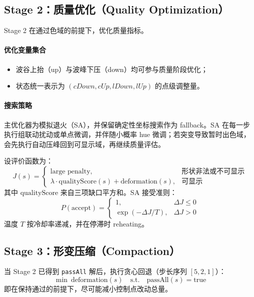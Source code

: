 \documentclass[UTF8,fontset=fandol]{ctexart}
\begin{document}
\subsection{Stage 2：质量优化（Quality Optimization）}
Stage 2 在通过色域的前提下，优化质量指标。

\paragraph{优化变量集合}
\begin{itemize}
    \item 波谷上抬（up）与波峰下压（down）均可参与质量阶段优化；
    \item 状态统一表示为 \((cDown,cUp,lDown,lUp)\) 的点级调整量。
\end{itemize}

\paragraph{搜索策略}
主优化器为模拟退火（SA），并保留确定性坐标搜索作为 fallback。SA 在每一步执行组联动扰动或单点微调，并伴随小概率 hue 微调；若突变导致暂时出色域，会先执行自动压峰回到可显示域，再继续质量评估。

设评价函数为：
\[
J(s)=
\begin{cases}
\text{large penalty}, & \text{形状非法或不可显示} \\
\lambda \cdot \text{qualityScore}(s)+\text{deformation}(s), & \text{可显示}
\end{cases}
\]
其中 \(\text{qualityScore}\) 来自三项缺口平方和。SA 接受准则：
\begin{equation}
P(\text{accept})=
\begin{cases}
1, & \Delta J \le 0\\
\exp(-\Delta J/T), & \Delta J > 0
\end{cases}
\end{equation}
温度 \(T\) 按冷却率递减，并在停滞时 reheating。

\subsection{Stage 3：形变压缩（Compaction）}
当 Stage 2 已得到 \texttt{passAll} 解后，执行贪心回退（步长序列 \([5,2,1]\)）：
\begin{equation}
\min \ \text{deformation}(s)\quad \text{s.t.}\quad \text{passAll}(s)=\text{true}
\end{equation}
即在保持通过的前提下，尽可能减小控制点改动总量。
\end{document}
